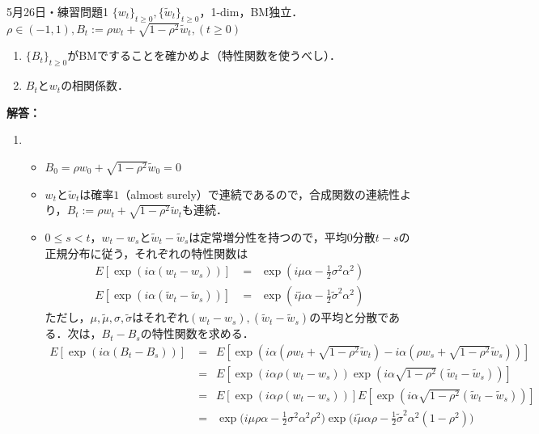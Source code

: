 \documentclass{jsarticle}
\begin{document}
\newpage
\begin{itembox}[l]{5月26日・練習問題1}
$\{w_t\}_{t \ge 0},\{\tilde{w}_t\}_{t \ge 0}$，1-dim，BM独立．\\
$\rho \in (-1,1), B_t := \rho w_t + \sqrt{1-\rho^2}\tilde{w}_t,(t \ge 0)$
\begin{enumerate}
\item $\{B_t\}_{t\ge 0}$がBMですることを確かめよ（特性関数を使うべし）．
\item $B_t$と$w_t$の相関係数．
\end{enumerate}
\end{itembox}
{\bf 解答：}
\begin{enumerate}
\item
\begin{itemize}
\item
$B_0 = \rho w_0 + \sqrt{1-\rho^2} \tilde{w}_0 = 0$
\item
$w_t$と$\tilde{w}_t$は確率$1$（almost surely）で連続であるので，合成関数の連続性より，$B_t := \rho w_t + \sqrt{1-\rho^2}\tilde{w}_t$も連続．
\item
$0 \le s < t$，$w_t-w_s$と$\tilde{w}_t - \tilde{w}_s$は定常増分性を持つので，平均$0$分散$t-s$の正規分布に従う，それぞれの特性関数は
\[
\begin{split}
E[\exp(i \alpha (w_t-w_s))] &=\,\,\, \exp(i\mu \alpha -\frac{1}{2}\sigma^2\alpha^2)\\
E[\exp(i \alpha (\tilde{w}_t-\tilde{w}_s))] &=\,\,\, \exp(i\tilde{\mu}\alpha-\frac{1}{2}\tilde{\sigma}^2\alpha^2)
\end{split}
\]
ただし，$\mu,\tilde{\mu},\sigma,\tilde{\sigma}$はそれぞれ$(w_t - w_s),(\tilde{w}_t - \tilde{w}_s)$の平均と分散である．次は，$B_t-B_s$の特性関数を求める．
\[
\begin{split}
E[\exp(i \alpha (B_t-B_s))] &= \,\,\, E[\exp(i \alpha (\rho w_t + \sqrt{1-\rho^2}\tilde{w}_t) - i \alpha (\rho w_s + \sqrt{1-\rho^2}\tilde{w}_s))] \\
&= \,\,\, E[\exp(i \alpha \rho ( w_t -  w_s)) \exp( i \alpha \sqrt{1-\rho^2}(\tilde{w}_t - \tilde{w}_s))]\\
&= \,\,\, E[\exp(i \alpha \rho ( w_t -  w_s))]E[ \exp( i \alpha \sqrt{1-\rho^2}(\tilde{w}_t - \tilde{w}_s))]\\
&=\,\,\, \exp \Bigr(i\mu \rho \alpha -\frac{1}{2}\sigma^2\alpha^2\rho^2 \Bigr) \exp \Bigr(i\tilde{\mu}\alpha\rho-\frac{1}{2}\tilde{\sigma}^2\alpha^2(1-\rho^2) \Bigr)\\

\end{split}\]
\end{itemize}
\end{enumerate}
\end{document}
